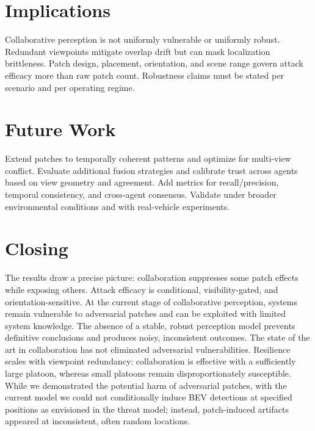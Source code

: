 \section{Implications}
Collaborative perception is not uniformly vulnerable or uniformly robust. Redundant viewpoints mitigate overlap drift but can mask localization brittleness. Patch design, placement, orientation, and scene range govern attack efficacy more than raw patch count. Robustness claims must be stated per scenario and per operating regime.

\section{Future Work}
Extend patches to temporally coherent patterns and optimize for multi-view conflict. Evaluate additional fusion strategies and calibrate trust across agents based on view geometry and agreement. Add metrics for recall/precision, temporal consistency, and cross-agent consensus. Validate under broader environmental conditions and with real-vehicle experiments.

\section{Closing}
The results draw a precise picture: collaboration suppresses some patch effects while exposing others. 
Attack efficacy is conditional, visibility-gated, and orientation-sensitive. 
At the current stage of collaborative perception, systems remain vulnerable to adversarial patches and can be exploited with limited system knowledge. 
The absence of a stable, robust perception model prevents definitive conclusions and produces noisy, inconsistent outcomes. 
The state of the art in collaboration has not eliminated adversarial vulnerabilities. 
Resilience scales with viewpoint redundancy: collaboration is effective with a sufficiently large platoon, whereas small platoons remain disproportionately susceptible. 
While we demonstrated the potential harm of adversarial patches, with the current model we could not conditionally induce BEV detections at specified positions as envisioned in the threat model; 
instead, patch-induced artifacts appeared at inconsistent, often random locations.
